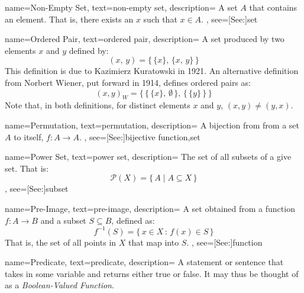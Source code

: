{
    name={Non-Empty Set},
    text={non-empty set},
    description={
        A set $A$ that contains an element. That is, there exists an $x$
        such that $x\in{A}$.
    },
    see=[See:]{set}
}

{
    name={Ordered Pair},
    text={ordered pair},
    description={
        A set produced by two elements $x$ and $y$ defined by:
        \begin{equation*}
            (x,\,y)=\big\{\,\{x\},\,\{x,\,y\}\,\big\}
        \end{equation*}
        This definition is due to Kazimierz Kuratowski in 1921. An alternative
        definition from Norbert Wiener, put forward in 1914, defines ordered
        pairs as:
        \begin{equation*}
            (x,y)_{W}=\Big\{\,\big\{\,\{x\},\,\emptyset\,\big\},
                            \,\big\{\,\{y\}\,\big\}\,\Big\}
        \end{equation*}
        Note that, in both definitions, for distinct elements $x$ and $y$,
        $(x,y)\ne(y,x)$.
    }
}

{
    name={Permutation},
    text={permutation},
    description={
        A bijection from from a set $A$ to itself, $f:A\rightarrow{A}$.
    },
    see=[See:]{bijective function,set}
}

{
    name={Power Set},
    text={power set},
    description={
        The set of all subsets of a give set. That is:
        \begin{equation*}
            \mathcal{P}(X)=\{\,A\;|\;A\subseteq{X}\,\}
        \end{equation*}
    },
    see=[See:]{subset}
}

{
    name={Pre-Image},
    text={pre-image},
    description={
        A set obtained from a function $f:A\rightarrow{B}$
        and a subset $S\subseteq{B}$, defined as:
        \begin{equation*}
            f^{\minus{1}}(S)=\{\,x\in{X}\,:\,f(x)\in{S}\,\}
        \end{equation*}
        That is, the set of all points in $X$ that map into $S$.
    },
    see=[See:]{function}
}

{
    name={Predicate},
    text={predicate},
    description={
        A statement or sentence that takes in some variable and returns either
        true or false. It may thus be thought of as a
        \textit{Boolean-Valued Function}.
    }
}


